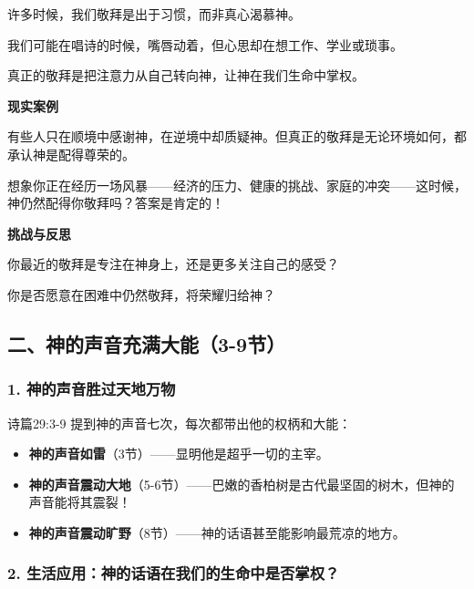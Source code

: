 \documentclass[a4paper, 12pt]{article}
\begin{document}
\hspace{0.6cm}许多时候，我们敬拜是出于习惯，而非真心渴慕神。

我们可能在唱诗的时候，嘴唇动着，但心思却在想工作、学业或琐事。

真正的敬拜是把注意力从自己转向神，让神在我们生命中掌权。

\vspace{0.2cm}

\textbf{现实案例}

\hspace{0.6cm}有些人只在顺境中感谢神，在逆境中却质疑神。但真正的敬拜是无论环境如何，都承认神是配得尊荣的。

\hspace{0.6cm}想象你正在经历一场风暴——经济的压力、健康的挑战、家庭的冲突——这时候，神仍然配得你敬拜吗？答案是肯定的！

\vspace{0.2cm}


\textbf{挑战与反思}

\hspace{0.6cm}你最近的敬拜是专注在神身上，还是更多关注自己的感受？

\hspace{0.6cm}你是否愿意在困难中仍然敬拜，将荣耀归给神？



\subsection*{二、神的声音充满大能（3-9节）}
\subsubsection*{1. 神的声音胜过天地万物}
\hspace{0.6cm}诗篇29:3-9 提到神的声音七次，每次都带出他的权柄和大能：
\begin{itemize}
    \item \textbf{神的声音如雷}（3节）——显明他是超乎一切的主宰。

    \item \textbf{神的声音震动大地}（5-6节）——巴嫩的香柏树是古代最坚固的树木，但神的声音能将其震裂！

    \item \textbf{神的声音震动旷野}（8节）——神的话语甚至能影响最荒凉的地方。

\end{itemize}
\subsubsection*{2. 生活应用：神的话语在我们的生命中是否掌权？}
\end{document}
